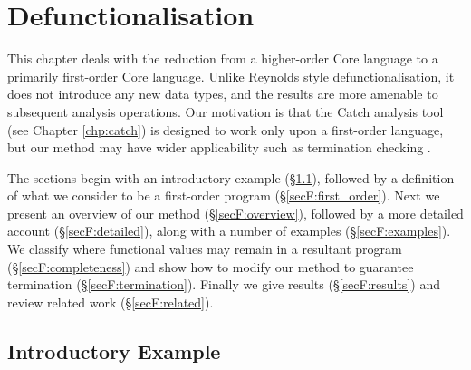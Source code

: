 


\newenvironment{definition}
    {\smallskip
     \noindent\textbf{Definition:}}
    {\noexample}

\begin{comment}
\begin{code}
f = undefined
\end{code}
\begin{code}
primNeqInt, primEqInt :: Int -> Int -> Bool
\end{code}
\end{comment}



\chapter{Defunctionalisation}
\label{chp:firstify}

This chapter deals with the reduction from a higher-order Core language to a primarily first-order Core language. Unlike Reynolds style defunctionalisation, it does not introduce any new data types, and the results are more amenable to subsequent analysis operations. Our motivation is that the Catch analysis tool (see Chapter \ref{chp:catch}) is designed to work only upon a first-order language, but our method may have wider applicability such as termination checking \cite{sereni:higher_order_termination}.

The sections begin with an introductory example (\S\ref{secF:intro}), followed by a definition of what we consider to be a first-order program (\S\ref{secF:first_order}). Next we present an overview of our method (\S\ref{secF:overview}), followed by a more detailed account (\S\ref{secF:detailed}), along with a number of examples (\S\ref{secF:examples}). We classify where functional values may remain in a resultant program (\S\ref{secF:completeness}) and show how to modify our method to guarantee termination (\S\ref{secF:termination}). Finally we give results (\S\ref{secF:results}) and review related work (\S\ref{secF:related}).

\section{Introductory Example}
\label{secF:intro}

